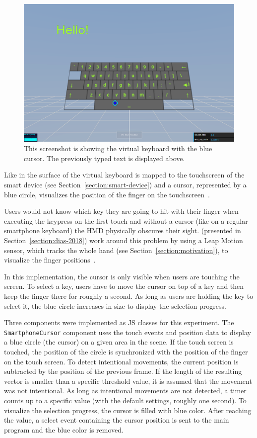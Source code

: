\begin{figure}[H]
	\centering
	\includegraphics[width=12cm]{figures/experiments/screenshot_exp_vk.png}
	\caption[Screenshot of the virtual keyboard]{This screenshot is showing the virtual keyboard with the blue cursor. The previously typed text is displayed above.}\label{fig:screenshot-exp-vk}
\end{figure}

Like in  the surface of the virtual keyboard is mapped to the touchscreen of the smart device (see Section~\ref{section:smart-device}) and a cursor, represented by a blue circle, visualizes the position of the finger on the touchscreen~\cite[408]{Markussen.2013}.

Users would not know which key they are going to hit with their finger when executing the keypress on the first touch and without a cursor (like on a regular smartphone keyboard) the \gls{HMD} physically obscures their sight. \citeauthor{Dias.2018} (presented in Section~\ref{section:dias-2018}) work around this problem by using a Leap Motion sensor, which tracks the whole hand (see Section~\ref{section:motivation}), to visualize the finger positions~\cite[4]{Dias.2018}.

In this implementation, the cursor is only visible when users are touching the screen. To select a key, users have to move the cursor on top of a key and then keep the finger there for roughly a second. As long as users are holding the key to select it, the blue circle increases in size to display the selection progress.

Three components were implemented as \acrlong{JS} classes for this experiment. The \lstinline{SmartphoneCursor} component uses the touch events and position data to display a blue circle (the cursor) on a given area in the scene. If the touch screen is touched, the position of the circle is synchronized with the position of the finger on the touch screen.
To detect intentional movements, the current position is subtracted by the position of the previous frame. If the length of the resulting vector is smaller than a specific threshold value, it is assumed that the movement was not intentional.
As long as intentional movements are not detected, a timer counts up to a specific value (with the default settings, roughly one second). To visualize the selection progress, the cursor is filled with blue color. After reaching the value, a select event containing the cursor position is sent to the main program and the blue color is removed. 

